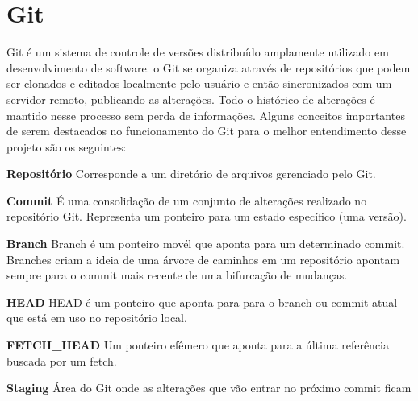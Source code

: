 	\section{Git}
	
	Git é um sistema de controle de versões distribuído amplamente utilizado em desenvolvimento de software. o Git se organiza através de repositórios que podem ser clonados e editados localmente pelo usuário e então sincronizados com um servidor remoto, publicando as alterações. Todo o histórico de alterações é mantido nesse processo sem perda de informações.
	Alguns conceitos importantes de serem destacados no funcionamento do Git para o melhor entendimento desse projeto são os seguintes:
	
	\textbf{Repositório}
	\newline
	Corresponde a um diretório de arquivos gerenciado pelo Git.
	
	\textbf{Commit}
	\newline
	É uma consolidação de um conjunto de alterações realizado no repositório Git. Representa um ponteiro para um estado específico (uma versão).
	
	\textbf{Branch}
	\newline
	Branch é um ponteiro movél que aponta para um determinado commit. Branches criam a ideia de uma árvore de caminhos em um repositório apontam sempre para o commit mais recente de uma bifurcação de mudanças.
	
	\textbf{HEAD}
	\newline
	HEAD é um ponteiro que aponta para para o branch ou commit atual que está em uso no repositório local.
	
	\textbf{FETCH\_HEAD}
	\newline
	Um ponteiro efêmero que aponta para a última referência buscada por um fetch.
	
	\textbf{Staging}
	\newline
	Área do Git onde as alterações que vão entrar no próximo commit ficam
	
